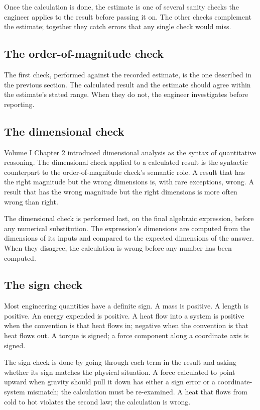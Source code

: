 Once the calculation is done, the estimate is one of several
sanity checks the engineer applies to the result before passing it
on. The other checks complement the estimate; together they catch
errors that any single check would miss.

\subsection{The order-of-magnitude check}

The first check, performed against the recorded estimate, is the one
described in the previous section. The calculated result and the
estimate should agree within the estimate's stated range. When they
do not, the engineer investigates before reporting.

\subsection{The dimensional check}

Volume I Chapter 2 introduced dimensional analysis as the syntax of
quantitative reasoning. The dimensional check applied to a calculated
result is the syntactic counterpart to the order-of-magnitude check's
semantic role. A result that has the right magnitude but the wrong
dimensions is, with rare exceptions, wrong. A result that has the
wrong magnitude but the right dimensions is more often wrong than
right.

The dimensional check is performed last, on the final algebraic
expression, before any numerical substitution. The expression's
dimensions are computed from the dimensions of its inputs and
compared to the expected dimensions of the answer. When they disagree,
the calculation is wrong before any number has been computed.

\subsection{The sign check}

Most engineering quantities have a definite sign. A mass is positive.
A length is positive. An energy expended is positive. A heat flow
into a system is positive when the convention is that heat flows in;
negative when the convention is that heat flows out. A torque is
signed; a force component along a coordinate axis is signed.

The sign check is done by going through each term in the result and
asking whether its sign matches the physical situation. A force
calculated to point upward when gravity should pull it down has
either a sign error or a coordinate-system mismatch; the calculation
must be re-examined. A heat that flows from cold to hot violates the
second law; the calculation is wrong.

